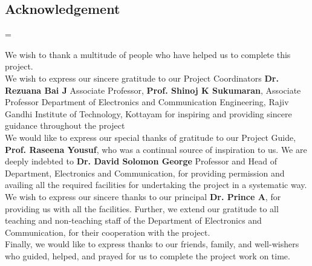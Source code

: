 \begin{center}

    \vspace{6pt}
    \vspace{20pt}

    \begin{minipage} {0.9\textwidth}

        \chapter*{Acknowledgement}


        \setlength{\parindent}{10pt}
        \setlength{\parskip}{10pt}

        \emergencystretch=\maxdimen

        \noindent We wish to thank a multitude of people who have helped us to complete this project.
        \\


        \noindent We wish to express our sincere gratitude to our Project Coordinators \textbf{Dr. Rezuana Bai J}
        Associate Professor, \textbf{Prof. Shinoj K Sukumaran}, Associate Professor Department of Electronics
        and Communication Engineering, Rajiv Gandhi Institute of Technology, Kottayam
        for inspiring and providing sincere guidance throughout the project
        \\


        \noindent We would like to express our special thanks of gratitude to our Project Guide,
        \textbf{Prof. Raseena Yousuf}, who was a continual source of inspiration to us. We are
        deeply indebted to \textbf{Dr. David Solomon George} Professor and Head of Department,
        Electronics and Communication, for providing permission and availing all the required
        facilities for undertaking the project in a systematic way. We wish to express our sincere
        thanks to our principal \textbf{Dr. Prince A}, for providing us with all the facilities. Further,
        we extend our gratitude to all teaching and non-teaching staff of the Department of Electronics
        and Communication, for their cooperation with the project.
        \\


        \noindent Finally, we would like to express thanks to our friends, family, and well-wishers who
        guided, helped, and prayed for us to complete the project work on time.

    \end{minipage}

\end{center}

\pagebreak
